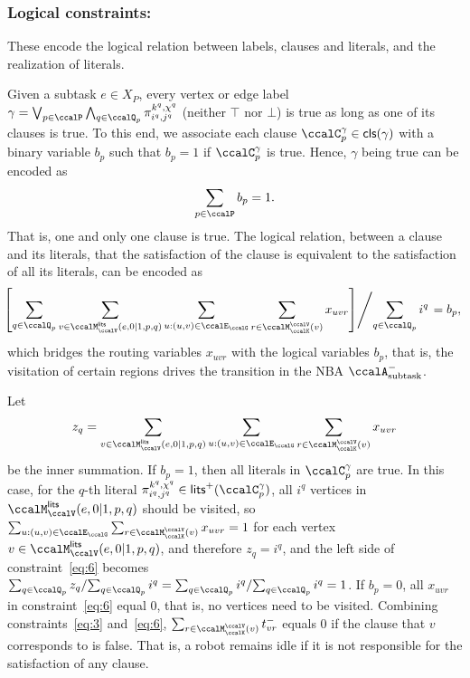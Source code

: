 \documentclass[Afour,sageh,times]{sagej}
\newcommand{\clause}[1]{\mathsf{cls}(#1)}
\newcommand{\auto}[1]{\ccalA_{\text{#1}}}
\renewcommand{\ap}[3]{\mathcal{\pi}_{{#1},{#2}}^{#3}}
\begin{document}
{  \subsubsection{Logical constraints:}\label{sec:labelconstraints} These encode the logical relation between labels, clauses and literals, and the realization of literals.
                {Given a subtask $e\in X_P$, every vertex or edge label  $\gamma  = \bigvee_{p\in \ccalP} \bigwedge_{q\in \ccalQ_p} \ap{i^q}{j^q}{k^q,\chi^q}$ (neither $\top$ nor $\bot$) is true as long as one of its clauses is true.  To this end, we associate each clause  $\ccalC_{p}^{\gamma} \in \clause{\gamma}$ with a binary variable $b_p$ such that $b_p=1$ if $\ccalC_{p}^{\gamma}$ is true. Hence, $\gamma$ being true can be encoded as
\begingroup\makeatletter\def\f@size{10}\check@mathfonts
\def\maketag@@@#1{\hbox{\m@th\normalsize\normalfont#1}}%
\begin{align}\label{eq:c}
   \sum_{p  \in \ccalP} b_p = 1.
\end{align}
\endgroup
That is, one and only one clause is true. The logical relation, between a clause and its literals, that the satisfaction of the clause is equivalent to the satisfaction of all its literals, can be encoded as
\begingroup\makeatletter\def\f@size{9}\check@mathfonts
\def\maketag@@@#1{\hbox{\m@th\normalsize\normalfont#1}}%
\begin{align}
 \!\!\!  \left. \left[ \sum_{q\in \ccalQ_p} \sum_{v \in \ccalM^\mathsf{lits}_{\ccalV}(e,0|1,p,q)} \sum_{u: (u,v) \in \ccalE_\ccalG} \sum_{r\in \ccalM^\ccalV_{\ccalK}(v)} x_{uvr} \right] \middle/ {\sum_{q\in \ccalQ_p} i^q} \right.= b_p, \label{eq:6}
\end{align}
\endgroup
which bridges the routing variables $x_{uvr}$ with the logical variables $b_p$, that is, the visitation of certain regions drives the transition in the NBA $\auto{subtask}^-$. {Let $$z_{q} = \sum_{v \in \ccalM^\mathsf{lits}_{\ccalV}(e,0|1,p,q)} \sum_{u: (u,v) \in \ccalE_\ccalG} \sum_{r\in \ccalM^\ccalV_{\ccalK}(v)} x_{uvr}$$ be the inner summation. If $b_p=1$, then all literals in $\ccalC_p^{\gamma}$ are true. In this case, for the $q$-th literal $\ap{i^q}{j^q}{k^q,\chi^q} \in \mathsf{lits}^+(\ccalC_p^\gamma)$, all $i^q$ vertices in ${\ccalM^\mathsf{lits}_{\ccalV}(e,0|1,p,q)}$ should be visited, so $\sum_{u: (u,v) \in \ccalE_\ccalG} \sum_{r\in \ccalM^\ccalV_{\ccalK}(v)} x_{uvr} = 1$ for each vertex $v \in {\ccalM^\mathsf{lits}_{\ccalV}(e,0|1,p,q)}$, and therefore $z_{q}= i^q$, and the left side of constraint~\eqref{eq:6} becomes $ \sum_{q\in \ccalQ_p} z_q/ {\sum_{q\in \ccalQ_p} i^q} = {\sum_{q\in \ccalQ_p} i^q}/{\sum_{q\in \ccalQ_p} i^q} = 1 $. If $b_p=0$, all $x_{uvr}$ in constraint~\eqref{eq:6} equal 0, that is, no vertices need to be visited. Combining constraints~\eqref{eq:3} and~\eqref{eq:6}, $\sum_{r\in \ccalM^\ccalV_{\ccalK}(v)} t^-_{vr}$ equals 0 if the  clause that $v$ corresponds to is false. That is, a robot remains idle if it is not responsible for the satisfaction of any clause.

}}}
\end{document}
